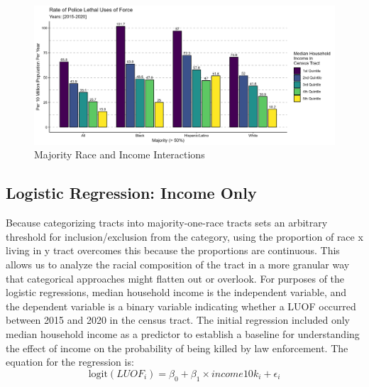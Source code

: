 \documentclass[12pt]{article}
\begin{document}
\begin{figure}[H]
  \centering %
  \includegraphics[width=\linewidth]{images/race_only_denom_race}
  \captionsetup{justification=centering, singlelinecheck=false, margin=2cm}
  \caption[Majority Race and Income Interactions]{Majority Race and Income Interactions}
  \label{fig:majority_income_interactions}
\end{figure}


\subsection{Logistic Regression: Income Only}

Because categorizing tracts into majority-one-race tracts sets an arbitrary threshold for inclusion/exclusion from the category, using the proportion of race x living in y tract overcomes this because the proportions are continuous. This allows us to analyze the racial composition of the tract in a more granular way that categorical approaches might flatten out or overlook. For purposes of the logistic regressions, median household income is the independent variable, and the dependent variable is a binary variable indicating whether a LUOF occurred between 2015 and 2020 in the census tract. The initial regression included only median household income as a predictor to establish a baseline for understanding the effect of income on the probability of being killed by law enforcement. The equation for the regression is:
\begin{equation}
\text{logit}(LUOF_{i})=\beta_{0} + \beta_{1} \times income10k_{i} + \epsilon_{i}
\end{equation}
\end{document}
